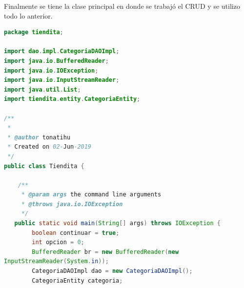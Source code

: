 \documentclass[a4paper,12pt]{article}
\begin{document}
Finalmente se tiene la clase principal en donde se trabajó el CRUD y se utilizo 
todo lo anterior.

\begin{lstlisting}[language=Java, style=customJava, 
caption={Tiendita.java}, captionpos=b,basicstyle=\fontfamily{cmss}\small]
package tiendita;

import dao.impl.CategoriaDAOImpl;
import java.io.BufferedReader;
import java.io.IOException;
import java.io.InputStreamReader;
import java.util.List;
import tiendita.entity.CategoriaEntity;

/**
 *
 * @author tonatihu
 * Created on 02-Jun-2019
 */
public class Tiendita {

    /**
     * @param args the command line arguments
     * @throws java.io.IOException
     */
   public static void main(String[] args) throws IOException {
        boolean continuar = true;
        int opcion = 0;
        BufferedReader br = new BufferedReader(new 
InputStreamReader(System.in));
        CategoriaDAOImpl dao = new CategoriaDAOImpl();
        CategoriaEntity categoria;


\end{lstlisting}
\end{document}
